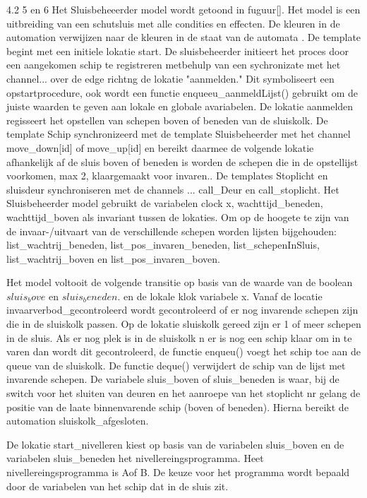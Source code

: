 4.2 5 en 6
Het Sluisbeheeerder model wordt getoond in fuguur[]. Het model is een uitbreiding van een schutsluis met alle condities en effecten. De kleuren in de automation verwijizen naar de kleuren in de staat van de automata . De template begint met een initiele lokatie start. De sluisbeheerder initieert het proces door een aangekomen schip te registreren metbehulp van een sychronizate met het channel... over de edge richtng de lokatie "aanmelden." Dit symboliseert een opstartprocedure, ook wordt een functie enqueeu_aanmeldLijst() gebruikt om de juiste waarden te geven aan lokale en globale avariabelen. De lokatie aanmelden regisseert het opstellen van schepen boven of beneden van de sluiskolk. De template Schip synchronizeerd met de template Sluisbeheerder met het channel move_down[id] of move_up[id] en bereikt daarmee de volgende lokatie afhankelijk af de sluis boven of beneden is worden de schepen die in de opstellijst voorkomen, max 2, klaargemaakt voor invaren.. De templates Stoplicht en sluisdeur synchroniseren met de channels ... call_Deur en call_stoplicht.
Het Sluisbeheerder model gebruikt de variabelen clock x, wachttijd_beneden, wachttijd_boven als invariant tussen de lokaties. Om op de hoogete te zijn van de invaar-/uitvaart van de verschillende schepen worden lijsten bijgehouden: list_wachtrij_beneden, list_pos_invaren_beneden, list_schepenInSluis, list_wachtrij_boven en list_pos_invaren_boven.

Het model voltooit de volgende transitie op basis van de waarde van de boolean $sluis_bove$ en $sluis_beneden$. en de lokale klok variabele x.
Vanaf de locatie invaarverbod_gecontroleerd  wordt gecontroleerd of er nog invarende schepen zijn die in de sluiskolk passen.
Op de lokatie sluiskolk gereed zijn er 1 of meer schepen in de sluis. Als er nog plek is in de sluiskolk n er is nog een schip klaar om in te varen dan wordt dit gecontroleerd, de functie enqueu() voegt het schip toe aan de queue van de sluiskolk. De functie deque() verwijdert de schip van de lijst met invarende schepen. De variabele sluis_boven of sluis_beneden is waar, bij de switch voor het sluiten van deuren en het aanroepe van het stoplicht nr gelang de positie van  de laate binnenvarende schip (boven of beneden). Hierna bereikt de automation sluiskolk_afgesloten.



De lokatie start_nivelleren kiest op basis van de variabelen sluis_boven en de variabelen sluis_beneden het nivellereingsprogramma.
Heet nivellereingsprogramma is Aof B. De keuze voor het programma wordt bepaald door de variabelen van het schip dat in de sluis zit.

